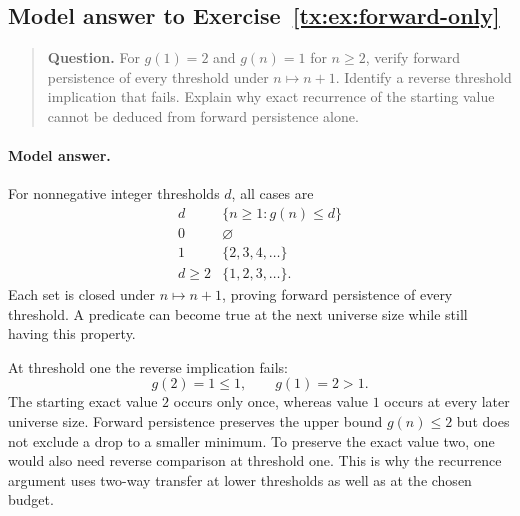 \documentclass[11pt,a4paper,oneside,openany]{book}
\theoremstyle{definition}\newtheorem{definition}[theorem]{Definition}
\theoremstyle{remark}\newtheorem{remark}[theorem]{Remark}
\numberwithin{equation}{chapter}
\begin{document}
\begin{samepage}

\subsection*{Model answer to Exercise~\ref{tx:ex:forward-only}}\label{tx:ans:forward-only}

\begin{quote}\small\textbf{Question.} For $g(1)=2$ and $g(n)=1$ for $n\ge2$, verify forward persistence of
every threshold under $n\mapsto n+1$. Identify a reverse threshold
implication that fails. Explain why exact recurrence of the starting
value cannot be deduced from forward persistence alone.
\end{quote}

\paragraph{Model answer.}
For nonnegative integer thresholds \(d\), all cases are
\[
 \begin{array}{c|c}
 d&\{n\ge1:g(n)\le d\}\\ \hline
 0&\varnothing\\
 1&\{2,3,4,\ldots\}\\
 d\ge2&\{1,2,3,\ldots\}.
 \end{array}
\]
Each set is closed under \(n\mapsto n+1\), proving forward
persistence of every threshold. A predicate can become true at the
next universe size while still having this property.
\end{samepage}

At threshold one the reverse implication fails:
\[
                 g(2)=1\le1,\qquad g(1)=2>1.
\]
The starting exact value \(2\) occurs only once, whereas value \(1\)
occurs at every later universe size. Forward persistence preserves the upper
bound \(g(n)\le2\) but does not exclude a drop to a smaller minimum.
To preserve the exact value two, one would also need reverse
comparison at threshold one. This is why the recurrence argument
uses two-way transfer at lower thresholds as well as at the chosen budget.


\par
\end{document}
